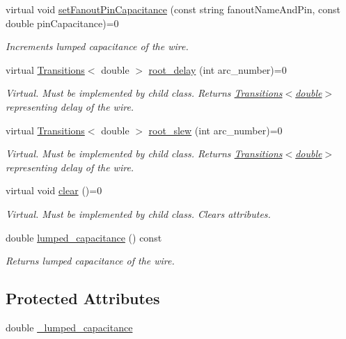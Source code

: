 \begin{DoxyCompactItemize}
virtual void \hyperlink{classWireDelayModel_a27d557bc1f2ed7e5e9787a8a5d82ecb2}{set\-Fanout\-Pin\-Capacitance} (const string fanout\-Name\-And\-Pin, const double pin\-Capacitance)=0
\begin{DoxyCompactList}\small\item\em Increments lumped capacitance of the wire. \end{DoxyCompactList}\item 
virtual \hyperlink{classTransitions}{Transitions}$<$ double $>$ \hyperlink{classWireDelayModel_a4f4ab93810af8ad90fd9fca0b06de141}{root\-\_\-delay} (int arc\-\_\-number)=0
\begin{DoxyCompactList}\small\item\em Virtual. Must be implemented by child class. Returns \hyperlink{classTransitions}{Transitions$<$double$>$} representing delay of the wire. \end{DoxyCompactList}\item 
virtual \hyperlink{classTransitions}{Transitions}$<$ double $>$ \hyperlink{classWireDelayModel_a9e5344c26b73f549a2b5c38fea8af13d}{root\-\_\-slew} (int arc\-\_\-number)=0
\begin{DoxyCompactList}\small\item\em Virtual. Must be implemented by child class. Returns \hyperlink{classTransitions}{Transitions$<$double$>$} representing delay of the wire. \end{DoxyCompactList}\item 
virtual void \hyperlink{classWireDelayModel_a74869a3a66deb53507e8bc6f16eff45c}{clear} ()=0
\begin{DoxyCompactList}\small\item\em Virtual. Must be implemented by child class. Clears attributes. \end{DoxyCompactList}\item 
double \hyperlink{classWireDelayModel_a05f509843dfa07e17c9b6cc16ba9aaa0}{lumped\-\_\-capacitance} () const 
\begin{DoxyCompactList}\small\item\em Returns lumped capacitance of the wire. \end{DoxyCompactList}\end{DoxyCompactItemize}
\subsection*{Protected Attributes}
\begin{DoxyCompactItemize}
\item 
double \hyperlink{classWireDelayModel_ab03b1640710e81c9dcd4cbe9b7fed329}{\-\_\-lumped\-\_\-capacitance}
\end{DoxyCompactItemize}
